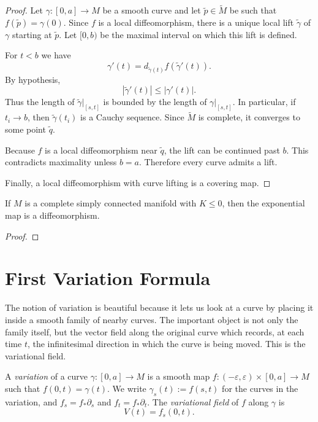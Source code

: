 \begin{proof}
Let $\gamma:[0,a]\to M$ be a smooth curve
and let $\tilde p\in \tilde M$ be such that
$f(\tilde p)=\gamma(0)$. Since $f$ is a
local diffeomorphism, there is a unique local
lift $\tilde\gamma$ of $\gamma$ starting at
$\tilde p$. Let $[0,b)$ be the maximal
interval on which this lift is defined.

For $t<b$ we have
$$
\gamma'(t)=d_{\tilde\gamma(t)}f
(\tilde\gamma'(t)).
$$
By hypothesis,
$$
|\tilde\gamma'(t)|\leq |\gamma'(t)|.
$$
Thus the length of $\tilde\gamma|_{[s,t]}$
is bounded by the length of
$\gamma|_{[s,t]}$. In particular, if
$t_i\to b$, then $\tilde\gamma(t_i)$ is a
Cauchy sequence. Since $\tilde M$ is complete,
it converges to some point $\tilde q$.

Because $f$ is a local diffeomorphism near
$\tilde q$, the lift can be continued past
$b$. This contradicts maximality unless
$b=a$. Therefore every curve admits a lift.

Finally, a local diffeomorphism with curve
lifting is a covering map.
\end{proof}

\begin{theorem}[Hadamard]
\label{theorem-Hadamard}
If $M$ is a complete simply connected
manifold with $K\leq 0$, then the
exponential map is a diffeomorphism.
\end{theorem}

\begin{proof}

\end{proof}

\section{First Variation Formula}
\label{section-first-variation}

\noindent
The notion of variation is beautiful because
it lets us look at a curve by placing it
inside a smooth family of nearby curves. The
important object is not only the family
itself, but the vector field along the
original curve which records, at each time
$t$, the infinitesimal direction in which the
curve is being moved. This is the
variational field.

\begin{definition}
\label{definition-variation}
A {\it variation} of a curve
$\gamma:[0,a]\to M$ is a smooth map
$f:(-\varepsilon,\varepsilon)\times[0,a]\to
M$ such that $f(0,t)=\gamma(t)$. We write
$\gamma_s(t):=f(s,t)$ for the curves in the
variation, and
$f_s=f_*\partial_s$ and $f_t=f_*\partial_t$.
The {\it variational field} of $f$ along
$\gamma$ is
$$
V(t)=f_s(0,t).
$$
\end{definition}

